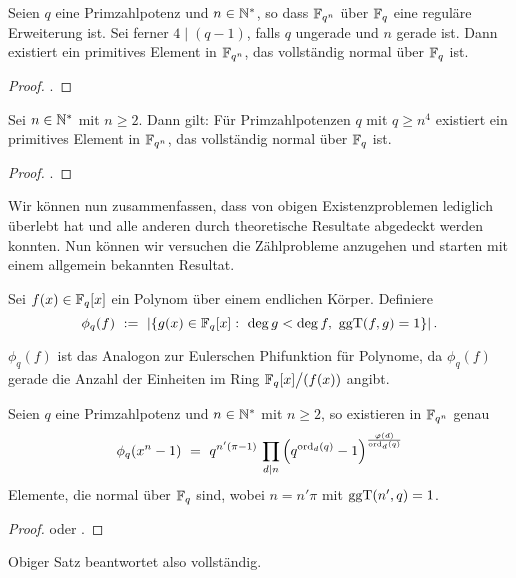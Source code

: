 \begin{satz}
  Seien $q$ eine Primzahlpotenz und $n \in \mathbb{N}^\ast$, so dass
  $\mathbb{F}_{q^n}$ über $\mathbb{F}_q$ eine reguläre Erweiterung ist. Sei ferner
  $4\mid (q-1)$, falls $q$ ungerade und $n$ gerade ist. Dann existiert ein
  primitives Element in $\mathbb{F}_{q^n}$, das vollständig normal über $\mathbb{F}_q$ ist.
\end{satz}
\begin{proof}
  \autocite[Theorem 1.4]{hachenberger2001}.
\end{proof}


\begin{satz}
  Sei $n\in \mathbb{N}^\ast$ mit $n\geq 2$. Dann gilt:
  Für Primzahlpotenzen $q$ mit $q \geq n^4$ existiert ein primitives Element in 
  $\mathbb{F}_{q^n}$, das vollständig normal über $\mathbb{F}_q$ ist.
\end{satz}
\begin{proof}
  \autocite[Theorem 2]{hachenberger2014}.
\end{proof}

Wir können nun zusammenfassen, dass von obigen Existenzproblemen lediglich
 überlebt hat und alle anderen durch theoretische Resultate
abgedeckt werden konnten. Nun können wir versuchen die Zählprobleme anzugehen
und starten mit einem allgemein bekannten Resultat.

\begin{definition}
  Sei $f(x) \in \mathbb{F}_q[x]$ ein Polynom über einem endlichen Körper. Definiere
  \[ \phi_q(f) \speq{:=} |\{ g(x) \in \F_q[x]:\ 
    \deg g < \deg f,\ \ggT(f,g) = 1\}|\,.\]
\end{definition}

\begin{bemerkung}
  $\phi_q(f)$ ist das Analogon zur Eulerschen Phifunktion für Polynome, da
   $\phi_q(f)$ gerade die Anzahl der Einheiten im Ring $\mathbb{F}_q[x]\big/(f(x))$
   angibt.
\end{bemerkung}

\begin{satz}
  Seien $q$ eine Primzahlpotenz und $n\in \mathbb{N}^\ast$ mit $n\geq 2$, so existieren
  in $\mathbb{F}_{q^n}$ genau 
  \[ \phi_q(x^n-1) \ =\  q^{n'(\pi-1)}\,\prod_{d\mid n}
    \left( q^{\operatorname{ord}_d(q)} -1 \right)^{\frac{\varphi(d)}{\operatorname{ord}_d(q)}}\]
  Elemente, die normal über $\mathbb{F}_q$ sind, wobei $n = n'\pi$ mit $\operatorname{ggT}(n',q) = 1$.
\end{satz}
\begin{proof}
  \autocite[Theorem 3.73]{lidl1997finite} oder 
  \autocite[Theorem 10.5]{hachenberger1997finite}.
\end{proof}

Obiger Satz beantwortet also  vollständig.

